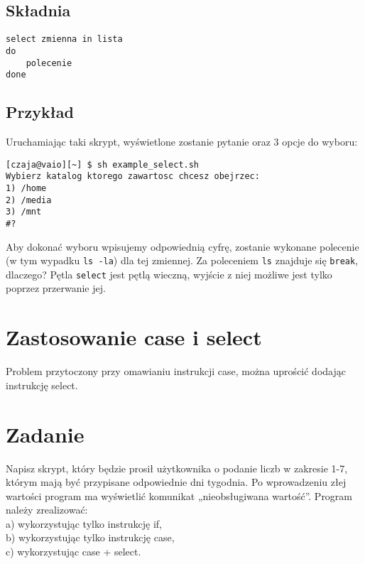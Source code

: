 \documentclass[10 pt, a4paper]{article}
\begin{document}
\subsection{Składnia}

\begin{lstlisting}
select zmienna in lista
do
	polecenie
done
\end{lstlisting}

\subsection{Przykład}


Uruchamiając taki skrypt, wyświetlone zostanie pytanie oraz 3 opcje do wyboru: \newline
\begin{verbatim}
[czaja@vaio][~] $ sh example_select.sh
Wybierz katalog ktorego zawartosc chcesz obejrzec:
1) /home
2) /media
3) /mnt
#?
\end{verbatim}
Aby dokonać wyboru wpisujemy odpowiednią cyfrę, zostanie wykonane polecenie (w tym
wypadku \texttt{ls -la}) dla tej zmiennej. Za poleceniem \texttt{ls} znajduje się \texttt{break}, dlaczego? Pętla \texttt{select} jest pętlą wieczną, wyjście z niej możliwe jest tylko poprzez przerwanie jej.
 
\section{Zastosowanie case i select}
Problem przytoczony przy omawianiu instrukcji case, można uprościć dodając instrukcję select. \newline


\section{Zadanie}
Napisz skrypt, który będzie prosił użytkownika o podanie liczb w zakresie 1-7, którym mają być przypisane  odpowiednie dni tygodnia. Po wprowadzeniu złej wartości program ma wyświetlić komunikat „nieobsługiwana wartość”. Program należy zrealizować:\\
	a) wykorzystując tylko instrukcję if,\\
	b) wykorzystując tylko instrukcję case,\\
	c) wykorzystując case + select.
\end{document}
